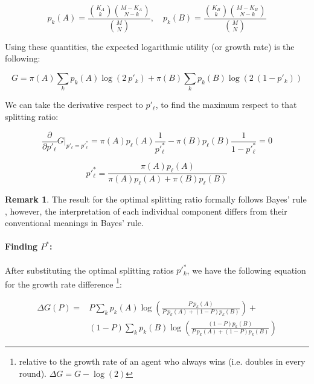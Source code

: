 \documentclass{article}
\theoremstyle{definition}
\newtheorem*{remark}{Remark}
\begin{document}
\begin{equation}
    p_k(A) = \frac{\binom{K_A}{k} \binom{M-K_A}{N-k}}{\binom{M}{N}}, \quad
    p_k(B) = \frac{\binom{K_B}{k} \binom{M-K_B}{N-k}}{\binom{M}{N}}
\end{equation}

Using these quantities, the expected logarithmic utility (or growth rate) is the following:

\begin{equation}
    G = \pi(A) \sum_k p_k(A) \log(2 \ p'_k) + \pi(B)  \sum_k p_k(B) \log(2 \ (1 - p'_k))
\end{equation}

We can take the derivative respect to $p'_\ell$, to find the maximum respect to that splitting ratio:

\begin{equation}
    \frac{\partial}{\partial p'_\ell} G \Bigr|_{p'_\ell=p'^*_\ell} = \pi(A) p_\ell(A) \frac{1}{p'^*_\ell} - \pi(B) p_\ell(B) \frac{1}{1-p'^*_\ell} = 0
\end{equation}

\begin{equation}
    p'^*_\ell = \frac{\pi(A) p_\ell(A)}{\pi(A) p_\ell(A)+\pi(B) p_\ell(B)}
\end{equation}

\begin{remark}
    The result for the optimal splitting ratio formally follows Bayes' rule \cite{sep:BayesTheorem}, however, the interpretation of each individual component differs from their conventional meanings in Bayes' rule.
    
\end{remark}

\paragraph{Finding $P^*$:}
\label{par:FindingPs}

After substituting the optimal splitting ratios $p'^*_k$, we have the following equation for the growth rate difference \footnote{relative to the growth rate of an agent who always wins (i.e. doubles in every round). $\Delta G = G - \log(2)$}:

\begin{equation}
    \begin{split}
        \Delta G(P)=&P \sum_k p_k(A) \log \left ( \frac{P \ p_k(A)}{P \ p_k(A)+(1-P) p_k(B)} \right ) + \\
                    &(1-P) \sum_k p_k(B) \log \left ( \frac{(1-P) p_k(B)}{P \ p_k(A)+(1-P) p_k(B)} \right )
    \end{split}
\end{equation}
\end{document}
